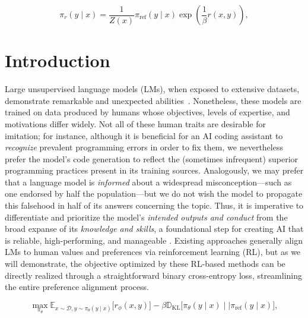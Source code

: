 \begin{equation}\label{eq:op_policy}
    \pi_r(y\mid x) = \frac{1}{Z(x)}\pi_\text{ref}(y\mid x)\exp\left(\frac{1}{\beta}r(x, y)\right),
\end{equation}

\section{Introduction}
Large unsupervised language models (LMs), when exposed to extensive datasets, demonstrate remarkable and unexpected abilities~\citep{chowdhery2022palm, brown2020language, touvron2023llama,bubeck2023sparks}. Nonetheless, these models are trained on data produced by humans whose objectives, levels of expertise, and motivations differ widely. Not all of these human traits are desirable for imitation; for instance, although it is beneficial for an AI coding assistant to \textit{recognize} prevalent programming errors in order to fix them, we nevertheless prefer the model’s code generation to reflect the (sometimes infrequent) superior programming practices present in its training sources. Analogously, we may prefer that a language model is \textit{informed} about a widespread misconception—such as one endorsed by half the population—but we do not wish the model to propagate this falsehood in half of its answers concerning the topic. Thus, it is imperative to differentiate and prioritize the model’s \emph{intended outputs and conduct} from the broad expanse of its \textit{knowledge and skills}, a foundational step for creating AI that is reliable, high-performing, and manageable \citep{ouyang2022training}. Existing approaches generally align LMs to human values and preferences via reinforcement learning (RL), but as we will demonstrate, the objective optimized by these RL-based methods can be directly realized through a straightforward binary cross-entropy loss, streamlining the entire preference alignment process.

\begin{equation}\label{eq:RL}
\max_{\pi_{\theta}}  \mathbb{E}_{x\sim \mathcal{D}, y\sim \pi_{\theta}(y \mid x)}\bigl[r_{\phi}(x, y)\bigr] - \beta\mathbb{D}_{\textrm{KL}}\bigl[\pi_{\theta}(y\mid x)\mid \mid \pi_\text{ref}(y\mid x)\bigr],
\end{equation}

